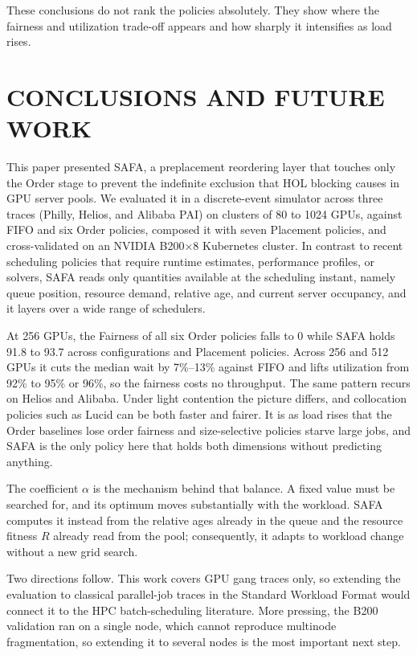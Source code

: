 \documentclass{ieeetj}
\begin{document}
These conclusions do not rank the policies absolutely. They show where the fairness and utilization trade-off appears and how sharply it intensifies as load rises.

\FloatBarrier

\section{CONCLUSIONS AND FUTURE WORK}\label{conclu}

This paper presented SAFA, a preplacement reordering layer that touches only the Order stage to prevent the indefinite exclusion that HOL blocking causes in GPU server pools. We evaluated it in a discrete-event simulator across three traces (Philly, Helios, and Alibaba PAI) on clusters of 80 to 1024 GPUs, against FIFO and six Order policies, composed it with seven Placement policies, and cross-validated on an NVIDIA B200$\times$8 Kubernetes cluster. In contrast to recent scheduling policies that require runtime estimates, performance profiles, or solvers, SAFA reads only quantities available at the scheduling instant, namely queue position, resource demand, relative age, and current server occupancy, and it layers over a wide range of schedulers.

At 256 GPUs, the Fairness of all six Order policies falls to 0 while SAFA holds 91.8 to 93.7 across configurations and Placement policies. Across 256 and 512 GPUs it cuts the median wait by 7\%--13\% against FIFO and lifts utilization from 92\% to 95\% or 96\%, so the fairness costs no throughput. The same pattern recurs on Helios and Alibaba. Under light contention the picture differs, and collocation policies such as Lucid can be both faster and fairer. It is as load rises that the Order baselines lose order fairness and size-selective policies starve large jobs, and SAFA is the only policy here that holds both dimensions without predicting anything.

The coefficient $\alpha$ is the mechanism behind that balance. A fixed value must be searched for, and its optimum moves substantially with the workload. SAFA computes it instead from the relative ages already in the queue and the resource fitness $R$ already read from the pool; consequently, it adapts to workload change without a new grid search.

Two directions follow. This work covers GPU gang traces only, so extending the evaluation to classical parallel-job traces in the Standard Workload Format would connect it to the HPC batch-scheduling literature. More pressing, the B200 validation ran on a single node, which cannot reproduce multinode fragmentation, so extending it to several nodes is the most important next step.
\end{document}

